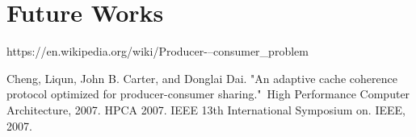 \documentclass[conference]{IEEEtran}
\begin{document}
\section{Future Works}


\newpage

\begin{thebibliography}{1}

https://en.wikipedia.org/wiki/Producer-–consumer\_problem

Cheng, Liqun, John B. Carter, and Donglai Dai. "An adaptive cache coherence protocol optimized for producer-consumer sharing." High Performance Computer Architecture, 2007. HPCA 2007. IEEE 13th International Symposium on. IEEE, 2007.

\end{thebibliography}
\end{document}
